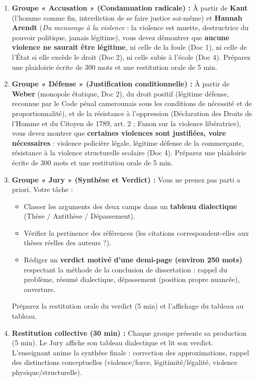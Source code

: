 \documentclass[11pt]{article}
\newcommand{\cle}[1]{{\popxbold\color{popdark}#1}}
\begin{document}
\begin{enumerate}
    \item \textbf{Groupe « Accusation » (Condamnation radicale) :} À partir de \textbf{Kant} (l'homme comme fin, interdiction de se faire justice soi-même) et \textbf{Hannah Arendt} (\emph{Du mensonge à la violence} : la violence est muette, destructrice du pouvoir politique, jamais légitime), vous devez démontrer que \textbf{aucune violence ne saurait être légitime}, ni celle de la foule (Doc 1), ni celle de l'État si elle excède le droit (Doc 2), ni celle subie à l'école (Doc 4). Préparez une plaidoirie écrite de 300 mots et une restitution orale de 5 min.
    \item \textbf{Groupe « Défense » (Justification conditionnelle) :} À partir de \textbf{Weber} (monopole étatique, Doc 2), du droit positif (\cle{légitime défense}, reconnue par le Code pénal camerounais sous les conditions de nécessité et de proportionnalité), et de la \cle{résistance à l'oppression} (Déclaration des Droits de l'Homme et du Citoyen de 1789, art. 2 ; Fanon sur la violence libératrice), vous devez montrer que \textbf{certaines violences sont justifiées, voire nécessaires} : violence policière légale, légitime défense de la commerçante, résistance à la violence structurelle scolaire (Doc 4). Préparez une plaidoirie écrite de 300 mots et une restitution orale de 5 min.
    \item \textbf{Groupe « Jury » (Synthèse et Verdict) :} Vous ne prenez pas parti a priori. Votre tâche :
    \begin{itemize}
        \item Classer les arguments des deux camps dans un \textbf{tableau dialectique} (Thèse / Antithèse / Dépassement).
        \item Vérifier la pertinence des références (les citations correspondent-elles aux thèses réelles des auteurs ?).
        \item Rédiger un \textbf{verdict motivé d'une demi-page (environ 250 mots)} respectant la méthode de la conclusion de dissertation : rappel du problème, résumé dialectique, dépassement (position propre nuancée), ouverture.
    \end{itemize}
    Préparez la restitution orale du verdict (5 min) et l'affichage du tableau au tableau.
    \item \textbf{Restitution collective (30 min) :} Chaque groupe présente sa production (5 min). Le Jury affiche son tableau dialectique et lit son verdict. L'enseignant anime la synthèse finale : correction des approximations, rappel des distinctions conceptuelles (violence/force, légitimité/légalité, violence physique/structurelle).
\end{enumerate}
\end{document}
